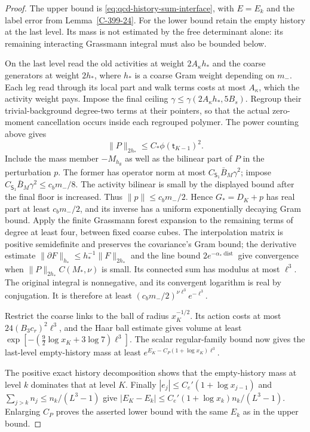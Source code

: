\documentclass[11pt,letterpaper,reqno]{amsart}
\theoremstyle{definition}
\theoremstyle{remark}
\begin{document}
\begin{proof}
The upper bound is \eqref{eq:qcd-history-sum-interface}, with
$E=E_k$ and the label error from Lemma~\ref{C-399-24}.
For the lower bound retain the empty history at the last
level. Its mass is not estimated by the free determinant
alone: its remaining interacting Grassmann integral must
also be bounded below.

On the last level read the old activities at weight
$2A_\kappa h_*$ and the coarse generators at weight $2h_*$,
where $h_*$ is a coarse Gram weight depending on $m_-$.
Each leg read through its local part and walk terms costs
at most $A_\kappa$, which the activity weight pays.
Impose the final ceiling $\gamma\le\gamma(2A_\kappa h_*,5B_s)$.
Regroup their trivial-background degree-two terms at their
pointers, so that the actual zero-moment cancellation occurs
inside each regrouped polymer. The power counting above gives
\[
 \|P\|_{2h_*}\le C_*\phi(\mathsf t_{K-1})^2.
\]
Include the mass member $-M_{h_\emptyset}$ as well as the
bilinear part of $P$ in the perturbation $p$. The former has
operator norm at most $C_{\mathsf S_1}\bar B_M\gamma^2$;
impose $C_{\mathsf S_1}\bar B_M\gamma^2\le c_bm_-/8$.
The activity bilinear is small by the displayed bound after
the final floor is increased. Thus $\|p\|\le c_bm_-/2$. Hence
$G_*=D_K+p$ has real part at least $c_bm_-/2$, and its
inverse has a uniform exponentially decaying Gram bound.
Apply the finite Grassmann forest expansion to the remaining
terms of degree at least four, between fixed coarse cubes.
The interpolation matrix is positive semidefinite and
preserves the covariance's Gram bound; the derivative estimate
$\|\partial F\|_{h_*}\le h_*^{-1}\|F\|_{2h_*}$ and the
line bound $2e^{-\alpha_*\operatorname{dist}}$ give convergence
when $\|P\|_{2h_*}C(M_*,\nu)$ is small. Its connected sum
has modulus at most $\ell^3$. The original integral is
nonnegative, and its convergent logarithm is real by
conjugation. It is therefore at least
$(c_bm_-/2)^{\nu\ell^3}e^{-\ell^3}$.

Restrict the coarse links to the ball of radius $x_K^{-1/2}$.
Its action costs at most $24(B_3c_r)^2\ell^3$, and the Haar
ball estimate gives volume at least
$\exp[-(\frac92\log x_K+3\log7)\ell^3]$.
The scalar regular-family bound now gives the last-level
empty-history mass at least
$e^{E_K-C_P(1+\log x_K)\ell^3}$.

The positive exact history decomposition shows that the
empty-history mass at level $k$ dominates that at level $K$.
Finally $|e_j|\le C_e'(1+\log x_{j-1})$ and
$\sum_{j>k}n_j\le n_k/(L^3-1)$ give
$|E_K-E_k|\le C_e'(1+\log x_k)n_k/(L^3-1)$.
Enlarging $C_P$ proves the asserted lower bound with the
same $E_k$ as in the upper bound.
\end{proof}
\end{document}
